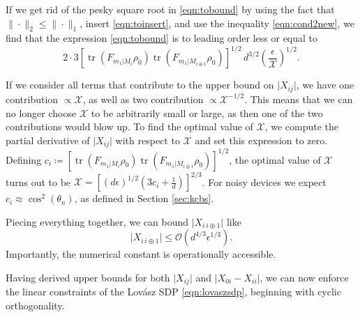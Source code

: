 If we get rid of the pesky square root in \ref{eqn:tobound} by using the fact that $\|\cdot\|_2\leq \|\cdot\|_1$, insert \ref{eqn:toinsert}, and use the inequality \ref{eqn:cond2new}, we find that the expression \ref{eqn:tobound} is to leading order less or equal to
\begin{equation}
2\cdot3\left[\operatorname{tr}(F_{m_1\vert M_i}\rho_0)\operatorname{tr}(F_{m_1\vert M_{i\oplus 1}}\rho_0)\right]^{1/2}\,d^{3/2}\left(\frac{\epsilon}{\mathcal{X}}\right)^{1/2}.
\end{equation}

If we consider all terms that contribute to the upper bound on $\vert X_{ij} \vert$, we have one contribution $\propto \mathcal{X}$, as well as two contribution $\propto \mathcal{X}^{-1/2}$. This means that we can no longer choose $\mathcal{X}$ to be arbitrarily small or large, as then one of the two contributions would blow up. To find the optimal value of $\mathcal{X}$, we compute the partial derivative of $\vert X_{ij}\vert$ with respect to $\mathcal{X}$ and set this expression to zero. Defining $ c_i \coloneqq \left[\operatorname{tr}(F_{m_1\vert M_i}\rho_0)\operatorname{tr}(F_{m_1\vert M_{i\oplus 1}}\rho_0)\right]^{1/2}$, the optimal value of $\mathcal{X}$ turns out to be $\mathcal{X}=\left[(d\epsilon)^{1/2}(3c_i +\frac{1}{d})\right]^{2/3}$. For noisy devices we expect $c_i\approx \cos^2(\theta_n)$, as defined in Section \ref{sec:kcbs}. 

Piecing everything together, we can bound $\vert X_{i\,i\oplus 1} \vert$ like
\begin{equation}
\vert X_{i\,i\oplus 1} \vert \leq \mathcal{O}\left(d^{4/3}\epsilon^{1/3}\right).
\end{equation}
Importantly, the numerical constant is operationally accessible.

Having derived upper bounds for both $\vert X_{ij} \vert$ and $\vert X_{0i}-X_{ii}\vert$, we can now enforce the linear constraints of the Lovász SDP \ref{eqn:lovaszsdp}, beginning with cyclic orthogonality.

